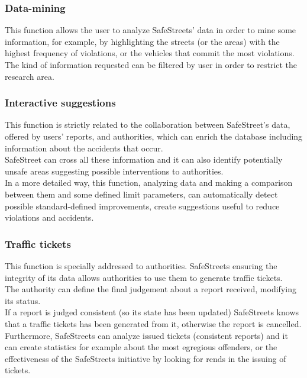 \documentclass{article}
\begin{document}
	\subsubsection{Data-mining}
	This function allows the user to analyze SafeStreets' data in order to mine some information, for example, by highlighting the streets (or the areas) with the highest frequency of violations, or the vehicles that commit the most violations. The kind of information requested can be filtered by user in order to restrict the research area. \\
	
	\subsubsection{Interactive suggestions}
	This function is strictly related to the collaboration between SafeStreet's data, offered by users' reports, and authorities, which can enrich the database including information about the accidents that occur. \\SafeStreet can cross all these information and it can also identify potentially unsafe areas suggesting possible interventions to authorities. \\
	In a more detailed way, this function, analyzing data and making a comparison between them and some defined limit parameters, can automatically detect possible standard-defined improvements, create suggestions useful to reduce violations and accidents.
	
	\subsubsection{Traffic tickets}
	This function is specially addressed to authorities. SafeStreets ensuring the integrity of its data allows authorities to use them to generate traffic tickets. \\
	The authority can define the final judgement about a report received, modifying its status.\\
	If a report is judged consistent (so its state has been updated) SafeStreets knows that a traffic tickets has been generated from it, otherwise the report is cancelled.\\
	Furthermore, SafeStreets can analyze issued tickets (consistent reports) and it can create statistics for example about the most egregious offenders, or the effectiveness of the SafeStreets initiative by looking for rends in the issuing of tickets.
	
	
\end{document}
